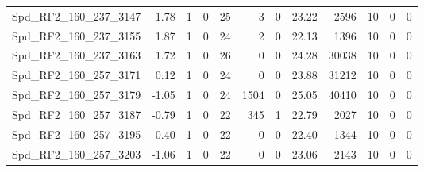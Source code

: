 \begin{longtable}[c]{@{}lrrrrrrrrrrr@{}}
Spd\_RF2\_160\_237\_3147     & 1.78                   & 1                       & 0                       & 25                     & 3                       & 0                       & 23.22                   & 2596                     & 10                       & 0                        & 0                        \\
Spd\_RF2\_160\_237\_3155     & 1.87                   & 1                       & 0                       & 24                     & 2                       & 0                       & 22.13                   & 1396                     & 10                       & 0                        & 0                        \\
Spd\_RF2\_160\_237\_3163     & 1.72                   & 1                       & 0                       & 26                     & 0                       & 0                       & 24.28                   & 30038                    & 10                       & 0                        & 0                        \\
Spd\_RF2\_160\_257\_3171     & 0.12                   & 1                       & 0                       & 24                     & 0                       & 0                       & 23.88                   & 31212                    & 10                       & 0                        & 0                        \\
Spd\_RF2\_160\_257\_3179     & -1.05                  & 1                       & 0                       & 24                     & 1504                    & 0                       & 25.05                   & 40410                    & 10                       & 0                        & 0                        \\
Spd\_RF2\_160\_257\_3187     & -0.79                  & 1                       & 0                       & 22                     & 345                     & 1                       & 22.79                   & 2027                     & 10                       & 0                        & 0                        \\
Spd\_RF2\_160\_257\_3195     & -0.40                  & 1                       & 0                       & 22                     & 0                       & 0                       & 22.40                   & 1344                     & 10                       & 0                        & 0                        \\
Spd\_RF2\_160\_257\_3203     & -1.06                  & 1                       & 0                       & 22                     & 0                       & 0                       & 23.06                   & 2143                     & 10                       & 0                        & 0                        \\

\end{longtable}
